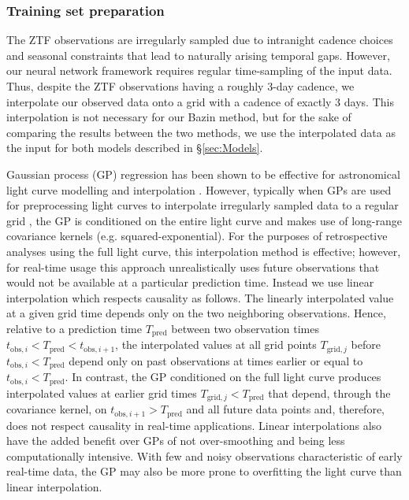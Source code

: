 \documentclass[fleqn,usenatbib]{mnras}
\begin{document}
\subsubsection{Training set preparation}
The ZTF observations are irregularly sampled due to intranight cadence choices and seasonal constraints that lead to naturally arising temporal gaps. However, our neural network framework requires regular time-sampling of the input data. Thus, despite the ZTF observations having a roughly 3-day cadence, we interpolate our observed data onto a grid with a cadence of exactly 3 days. This interpolation is not necessary for our Bazin method, but for the sake of comparing the results between the two methods, we use the interpolated data as the input for both models described in \S\ref{sec:Models}.

Gaussian process (GP) regression \citep{RasmussenGPsBook} has been shown to be effective for astronomical light curve modelling and interpolation \citep{Lochner2016, Boone2019Avacodo}. However, typically when GPs are used for preprocessing light curves to interpolate irregularly sampled data to a regular grid \citep[e.g.][]{Boone2019Avacodo,Villar2021_Anomalydetection}, the GP is conditioned on the entire light curve and makes use of long-range covariance kernels (e.g. squared-exponential). For the purposes of retrospective analyses using the full light curve, this interpolation method is effective; however, for real-time usage this approach unrealistically uses future observations that would not be available at a particular prediction time. Instead we use linear interpolation which respects causality as follows. The linearly interpolated value at a given grid time depends only on the two neighboring observations.  Hence, relative to a prediction  time $T_{\mathrm{pred}}$ between two observation times $t_{\mathrm{obs}, i} < T_{\mathrm{pred}} < t_{\mathrm{obs}, i+1}$, the interpolated values at all grid points $T_{\mathrm{grid},j}$ before $t_{\mathrm{obs}, i} <  T_{\mathrm{pred}}$ depend only on past observations at times earlier or equal to $t_{\mathrm{obs}, i} <  T_{\mathrm{pred}}$. In contrast, the GP conditioned on the full light curve produces interpolated values at earlier grid times $T_{\mathrm{grid},j} < T_{\mathrm{pred}}$ that depend, through the covariance kernel, on $t_{\mathrm{obs}, i+1} > T_{\mathrm{pred}}$ and all future data points and, therefore, does not respect causality in real-time applications. Linear interpolations also have the added benefit over GPs of not over-smoothing and being less computationally intensive. With few and noisy observations characteristic of early real-time data, the GP may also be more prone to overfitting the light curve than linear interpolation.
 
\end{document}
